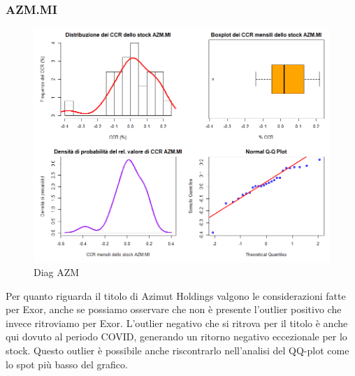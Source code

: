 \documentclass[12pt]{article}
\begin{document}
\subsubsection{AZM.MI}
\begin{figure}[!htb]
    \centering
    \includegraphics[width=1\textwidth]{immagini/diag_azm.png}
    \caption{Diag AZM}
\end{figure}
Per quanto riguarda il titolo di Azimut Holdings valgono le considerazioni fatte per Exor, anche se possiamo osservare che non è presente l'outlier positivo che invece ritroviamo per Exor. L'outlier negativo che si ritrova per il titolo è anche qui dovuto al periodo COVID, generando un ritorno negativo eccezionale per lo stock. Questo outlier è possibile anche riscontrarlo nell'analisi del QQ-plot come lo spot più basso del grafico.
\FloatBarrier
\newpage
\end{document}

